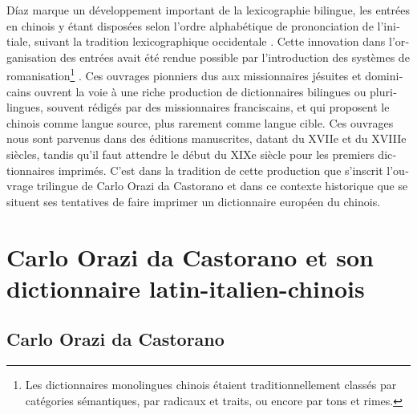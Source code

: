 \documentclass[output=paper,colorlinks,citecolor=brown,arabicfont,chinesefont,booklanguage=french]{langscibook}
\begin{document}
\begin{otherlanguage}{french}
Díaz marque un développement important de la lexicographie bilingue, les entrées en chinois y étant disposées selon l’ordre alphabétique de prononciation de l’initiale, suivant la tradition lexicographique occidentale \citep[236]{Masini2006}. Cette innovation dans l’organisation des entrées avait été rendue possible par l’introduction des systèmes de romanisation\footnote{Les dictionnaires monolingues chinois étaient traditionnellement classés par catégories sémantiques, par radicaux et traits, ou encore par tons et rimes.} \citep{Luo1930}. Ces ouvrages pionniers dus aux missionnaires jésuites et dominicains ouvrent la voie à une riche production de dictionnaires bilingues ou plurilingues, souvent rédigés par des missionnaires franciscains, et qui proposent le chinois comme langue source, plus rarement comme langue cible. Ces ouvrages nous sont parvenus dans des éditions manuscrites, datant du XVIIe et du XVIIIe siècles, tandis qu’il faut attendre le début du XIXe siècle pour les premiers dictionnaires imprimés. C’est dans la tradition de cette production que s’inscrit l’ouvrage trilingue de Carlo Orazi da Castorano et dans ce contexte historique que se situent ses tentatives de faire imprimer un dictionnaire européen du chinois.

\section{Carlo Orazi da Castorano et son dictionnaire latin-italien-chinois}

\subsection{Carlo Orazi da Castorano}


\end{otherlanguage}
\end{document}
